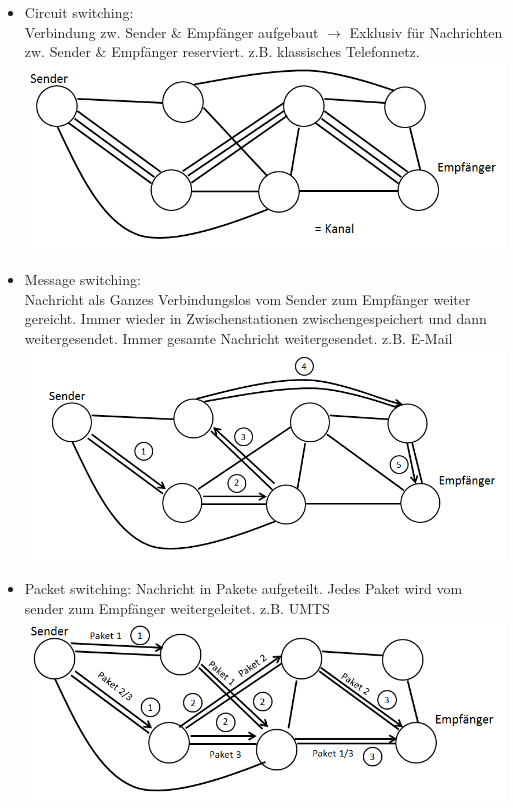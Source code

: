 \documentclass[12pt,a4paper]{report}
\theoremstyle{definition}
\begin{document}
\begin{itemize}
\item Circuit switching:\\
Verbindung zw. Sender \& Empfänger aufgebaut $\rightarrow$ Exklusiv für Nachrichten zw. Sender \& Empfänger reserviert. z.B. klassisches Telefonnetz.
\includegraphics[scale=0.8]{7-1.png}
\\
\item Message switching:\\
Nachricht als Ganzes Verbindungslos vom Sender zum Empfänger weiter gereicht. Immer wieder in Zwischenstationen zwischengespeichert und dann weitergesendet. Immer gesamte Nachricht weitergesendet. z.B. E-Mail\\
\includegraphics[scale=0.8]{7-2.png}
\\
\item Packet switching: Nachricht in Pakete aufgeteilt. Jedes Paket wird vom sender zum Empfänger weitergeleitet. z.B. UMTS\\
\includegraphics[scale=0.8]{7-3.png}
\end{itemize}
\end{document}
